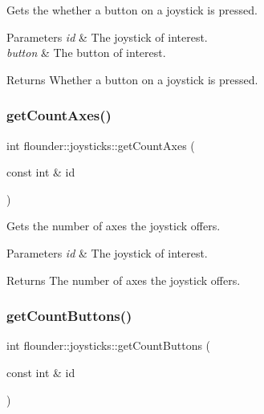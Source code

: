 Gets the whether a button on a joystick is pressed. 


\begin{DoxyParams}{Parameters}
{\em id} & The joystick of interest. \\
\hline
{\em button} & The button of interest. \\
\hline
\end{DoxyParams}
\begin{DoxyReturn}{Returns}
Whether a button on a joystick is pressed. 
\end{DoxyReturn}
\mbox{\label{classflounder_1_1joysticks_abe58d868cb70e9d7f2a10eb0f1b967e1}} 
\subsubsection{\texorpdfstring{get\+Count\+Axes()}{getCountAxes()}}
{\footnotesize\ttfamily int flounder\+::joysticks\+::get\+Count\+Axes (\begin{DoxyParamCaption}\item[{const int \&}]{id }\end{DoxyParamCaption})}



Gets the number of axes the joystick offers. 


\begin{DoxyParams}{Parameters}
{\em id} & The joystick of interest. \\
\hline
\end{DoxyParams}
\begin{DoxyReturn}{Returns}
The number of axes the joystick offers. 
\end{DoxyReturn}
\mbox{\label{classflounder_1_1joysticks_af502daffac227f63e673ed3f45850380}} 
\subsubsection{\texorpdfstring{get\+Count\+Buttons()}{getCountButtons()}}
{\footnotesize\ttfamily int flounder\+::joysticks\+::get\+Count\+Buttons (\begin{DoxyParamCaption}\item[{const int \&}]{id }\end{DoxyParamCaption})}



